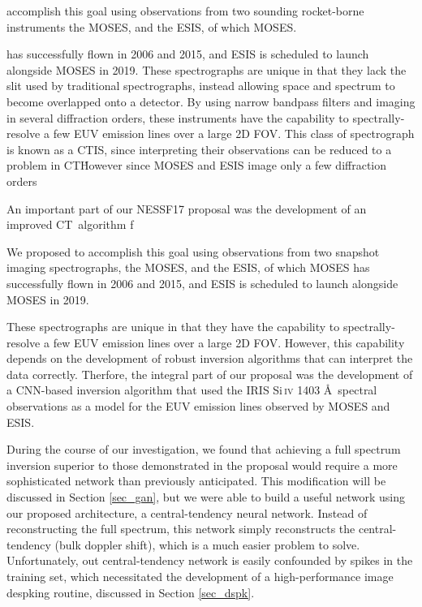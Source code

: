 \documentclass[10pt,letterpaper]{article}
\newcommand{\CT}{\ac{CT}}
\newcommand{\CTIS}{\ac{CTIS}}
\begin{document}
		
		accomplish this goal using observations from two sounding rocket-borne instruments the \ac{MOSES}, and the \ac{ESIS}, of which \ac{MOSES}.
		
		
		
		 has successfully flown in 2006 and 2015, and \ac{ESIS} is scheduled to launch alongside \ac{MOSES} in 2019.
		These spectrographs are unique in that they lack the slit used by traditional spectrographs, instead allowing space and spectrum to become overlapped onto a detector.
		By using narrow bandpass filters and imaging in several diffraction orders, these instruments have the capability to spectrally-resolve a few \ac{EUV} emission lines over a large 2D \ac{FOV}.
		This class of spectrograph is known as a \CTIS, since interpreting their observations can be reduced to a problem in \CT\.
		However since MOSES and ESIS image only a few diffraction orders 
		
		An important part of our NESSF17 proposal was the development of an improved \CT\ algorithm f

		
		We proposed to accomplish this goal using observations from two snapshot imaging spectrographs, the \ac{MOSES}, and the \ac{ESIS}, of which \ac{MOSES} has successfully flown in 2006 and 2015, and \ac{ESIS} is scheduled to launch alongside \ac{MOSES} in 2019.
		
		These spectrographs are unique in that they have the capability to spectrally-resolve a few \ac{EUV} emission lines over a large 2D \ac{FOV}.
		However, this capability depends on the development of robust inversion algorithms that can interpret the data correctly.
		Therfore, the integral part of our proposal was the development of a \ac{CNN}-based inversion algorithm that used the IRIS Si\,\textsc{iv} 1403 \AA\ spectral observations as a model for the \ac{EUV} emission lines observed by MOSES and ESIS.
		
		During the course of our investigation, we found that achieving a full spectrum inversion superior to those demonstrated in the proposal would require a more sophisticated network than previously anticipated.
		This modification will be discussed in Section \ref{sec_gan}, but we were able to build a useful network using our proposed architecture, a central-tendency neural network.
		Instead of reconstructing the full spectrum, this network simply reconstructs the central-tendency (bulk doppler shift), which is a much easier problem to solve.
		Unfortunately, out central-tendency network is easily confounded by spikes in the training set, which necessitated the development of a high-performance image despking routine, discussed in Section \ref{sec_dspk}.
		
\end{document}
